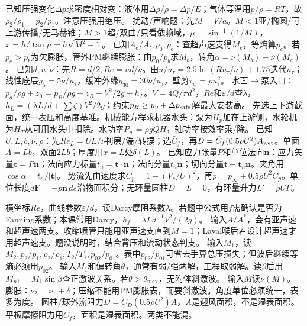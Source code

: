 已知压强变化$\Delta p$求密度相对变：液体用$\Delta\rho/\rho=\Delta p/E$；气体等温用$p/\rho=RT$，故$\rho_2/\rho_1=p_2/p_1$。注意压强用绝压。
扰动/声响题：先$M=V/a$。$M<1$亚/椭圆/可上游传播/无马赫锥；$M>1$超/双曲/只看依赖域，$\mu=\sin^{-1}(1/M)$，$x=h/\tan\mu=h\sqrt{M^2-1}$。
已知$A_e/A_t,p_0,p_b$：查超声速支得$M_e$，等熵算$p_e$。若$p_e>p_b$为欠膨胀，管外PM继续膨胀：由$p_0/p_b$求$M_b$，转角$\alpha=\nu(M_b)-\nu(M_e)$。
已知$d,\bar u,\nu$：先$R=d/2,Re=\bar ud/\nu$。由$\bar u/u_\tau=2.5\ln(Ru_\tau/\nu)+1.75$迭代$u_\tau$；线性底层$y_5=5\nu/u_\tau$，缓冲外缘$y_{30}=30\nu/u_\tau$，壁剪$\tau_w=\rho u_\tau^2$。
水面$\to$泵入口：$p_a/\rho g+z_0=p_B/\rho g+z_B+V^2/2g+h_L$。$V=4Q/\pi d^2$，$Re$和$\varepsilon/d$查$\lambda$，$h_L=(\lambda L/d+\sum\zeta)V^2/2g$；约束$p_B\ge p_v+\Delta p_{\rm safe}$解最大安装高。
先选上下游截面，统一表压和高度基准。机械能方程求机器水头：泵为$H_p$加在上游侧，水轮机为$H_T$从可用水头中扣除。水功率$P_w=\rho gQH$，轴功率按效率乘/除。
已知$U,L,b,\nu,\rho$：先$Re_L=UL/\nu$判层/湍/转捩；选$\bar C_f$，再$D=\bar C_f(0.5\rho U^2)A_{\rm wet}$。单面$A=Lb$，双面$2Lb$；厚度用$x=L$处$\delta(L)$。
已知应力张量$P$和单位法向$\bm n$：应力矢量$\bm t=P\bm n$；法向应力标量$t_n=\bm t\cdot\bm n$；法向分量$t_n\bm n$；切向分量$\bm t-\bm t_n\bm n$。夹角用$\cos\alpha=t_n/|\bm t|$。
势流先由速度求$C_p=1-(V_s/U)^2$，再$p=p_\infty+0.5\rho U^2 C_p$。单位长度$d\bm F=-p\bm n\,ds$沿物面积分；无环量圆柱$D=L=0$，有环量升力$L'=\rho U\Gamma$。

横坐标$Re$，曲线参数$\varepsilon/d$，读Darcy摩阻系数$\lambda$。若题中公式用$f$需确认是否为Fanning系数；本课常用Darcy，$h_f=\lambda Ld^{-1}V^2/(2g)$。
输入$A/A^*$，会有亚声速和超声速两支。收缩喷管只能用亚声速支直到$M=1$；Laval喉后若设计超声速才用超声速支。题没说明时，结合背压和流动状态判支。
输入$M_1$，读$M_2,p_2/p_1,\rho_2/\rho_1,T_2/T_1,p_{02}/p_{01}$。表中$p_{02}/p_{01}$可省去手算总压损失；但波后继续等熵必须用$p_{02}$。
输入$M_1$和偏转角$\theta$，通常有弱/强两解，工程取弱解。读$\beta$后用$M_{n1}=M_1\sin\beta$查正激波关系。若$\theta>\theta_{\max}$，无附体斜激波。
输入$M$读$\nu(M)$。膨胀：$\nu_2=\nu_1+\delta$；压缩不能用PM膨胀表，而要斜激波。角度单位必须统一，表多为度。
圆柱/球外流阻力$D=C_D(0.5\rho U^2)A$，$A$是迎风面积，不是湿表面积。平板摩擦阻力用$C_f$，面积是湿表面积。两类不能混。

